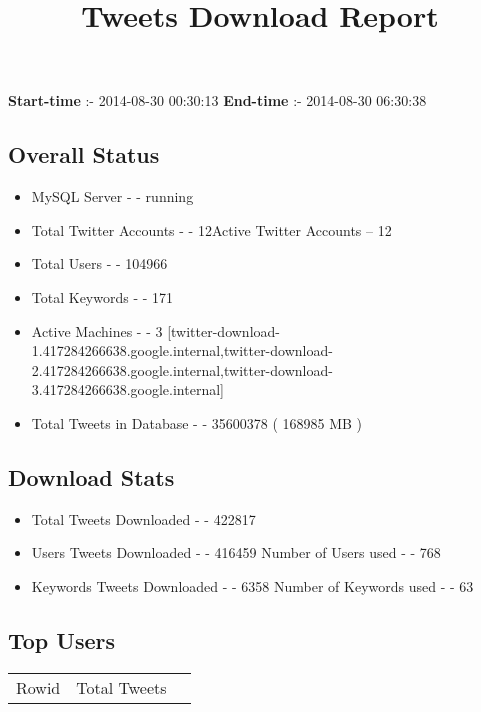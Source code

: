 \documentclass{article}\usepackage[T1]{fontenc}
\begin{document}
\title{\textbf{Tweets Download Report}}
               \date{}
                \maketitle
               \centerline{\textbf{Start-time} :- 2014-08-30 00:30:13 \hspace{40pt} \textbf{End-time} :- 2014-08-30 06:30:38}               \subsection*{Overall Status}                \begin{itemize}                \item MySQL Server - - running               \item Total Twitter Accounts - - 12\newline Active Twitter Accounts -- 12               \item Total Users - - 104966               \item Total Keywords - - 171               \item Active Machines - - 3 [twitter-download-1.417284266638.google.internal,twitter-download-2.417284266638.google.internal,twitter-download-3.417284266638.google.internal]               \item Total Tweets in Database - - 35600378 ( 168985 MB )               \end{itemize}               \subsection*{Download Stats}                \begin{itemize}                \item Total Tweets Downloaded - - 422817               \item Users Tweets Downloaded - - 416459 \newline Number of Users used - - 768               \item Keywords Tweets Downloaded - - 6358 \newline Number of Keywords used - - 63              \end{itemize}              \subsection*{Top Users}\begin{tabular}{|c|c|c|}         \hline         Rowid & Total Tweets \\ 

\end{tabular}
\end{document}
